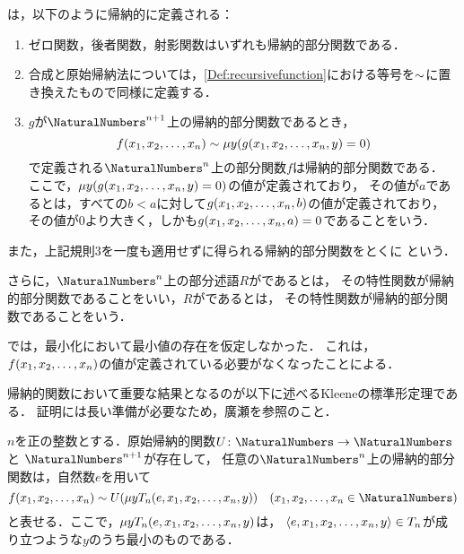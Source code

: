 \begin{Def} \label{Def:partialrecursivefunction}
	は，以下のように帰納的に定義される：
	\begin{enumerate}
		\item ゼロ関数，後者関数，射影関数はいずれも帰納的部分関数である．
		\item 合成と原始帰納法については，\cref{Def:recursivefunction}における等号を\(\sim\)に置き換えたもので同様に定義する．
		\item \(g\)が\(\NaturalNumbers^{n+1}\)上の帰納的部分関数であるとき，
		      \begin{equation}
			      \apply{f}{x_1, x_2, \dots, x_n} \partialequal \muoperator y \paren{\apply{g}{x_1, x_2, \dots, x_n, y} = 0}
			      \label{eq:partialequalminimization}
		      \end{equation}
		      で定義される\(\NaturalNumbers^n\)上の部分関数\(f\)は帰納的部分関数である．
		      ここで，\(\muoperator y \paren{\apply{g}{x_1, x_2, \dots, x_n, y} = 0}\)の値が定義されており，
		      その値が\(a\)であるとは，すべての\(b < a\)に対して\(\apply{g}{x_1, x_2, \dots, x_n, b}\)の値が定義されており，
		      その値が0より大きく，しかも\(\apply{g}{x_1, x_2, \dots, x_n, a} = 0\)であることをいう．
	\end{enumerate}

	また，上記規則3を一度も適用せずに得られる帰納的部分関数をとくに
	という．

	さらに，\(\NaturalNumbers^n\)上の部分述語\(R\)がであるとは，
	その特性関数が帰納的部分関数であることをいい，\(R\)がであるとは，
	その特性関数が帰納的部分関数であることをいう．
\end{Def}

では，最小化において最小値の存在を仮定しなかった．
これは，\(\apply{f}{x_1, x_2, \dots, x_n}\)の値が定義されている必要がなくなったことによる．

帰納的関数において重要な結果となるのが以下に述べるKleeneの標準形定理である．
証明には長い準備が必要なため，廣瀬\cite{hirose2024}を参照のこと．

\begin{Thm}[Kleeneの標準形定理]
	\(n\)を正の整数とする．原始帰納的関数\(U \colon \NaturalNumbers \to \NaturalNumbers\)と
	\(\NaturalNumbers^{n+1}\)が存在して，
	任意の\(\NaturalNumbers^n\)上の帰納的部分関数は，自然数\(e\)を用いて
	\begin{equation}
		\apply{f}{x_1, x_2, \dots, x_n} \partialequal \apply{U}{\muoperator y \apply{T_n}{e, x_1, x_2, \dots, x_n, y}}
		\quad \text{(\(x_1, x_2, \dots, x_n \in \NaturalNumbers\))}
		\label{eq:kleenenormaltheorem}
	\end{equation}
	と表せる．ここで，\(\muoperator y \apply{T_n}{e, x_1, x_2, \dots, x_n, y}\)は，
	\(\langle e, x_1, x_2, \dots, x_n, y \rangle \in T_n\)が成り立つような\(y\)のうち最小のものである．
\end{Thm}

